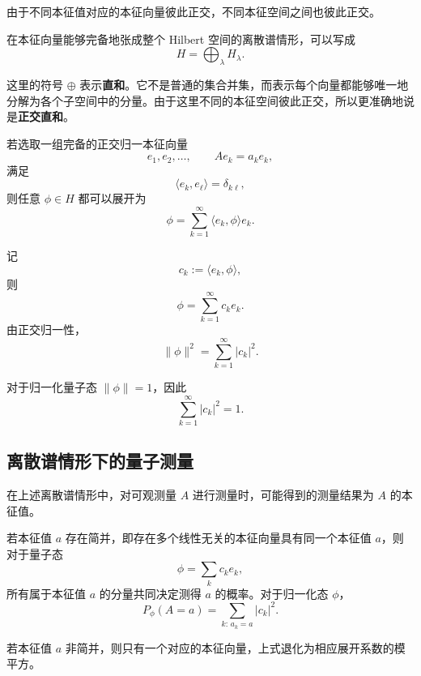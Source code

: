 \documentclass[UTF8,a4paper,11pt,openany]{ctexbook}
\begin{document}
由于不同本征值对应的本征向量彼此正交，不同本征空间之间也彼此正交。

在本征向量能够完备地张成整个 Hilbert 空间的离散谱情形，可以写成
\begin{equation}
    H
    =
    \bigoplus_{\lambda}H_\lambda.
\end{equation}

这里的符号 $\oplus$ 表示\textbf{直和}。它不是普通的集合并集，而表示每个向量都能够唯一地分解为各个子空间中的分量。由于这里不同的本征空间彼此正交，所以更准确地说是\textbf{正交直和}。

若选取一组完备的正交归一本征向量
\[
e_1,e_2,\ldots,
\qquad
Ae_k=a_ke_k,
\]
满足
\begin{equation}
    \langle e_k,e_\ell\rangle
    =
    \delta_{k\ell},
\end{equation}
则任意 $\phi\in H$ 都可以展开为
\begin{equation}
    \phi
    =
    \sum_{k=1}^{\infty}
    \langle e_k,\phi\rangle e_k.
\end{equation}

记
\[
c_k:=\langle e_k,\phi\rangle,
\]
则
\[
\phi
=
\sum_{k=1}^{\infty}c_ke_k.
\]
由正交归一性，
\begin{equation}
    \|\phi\|^2
    =
    \sum_{k=1}^{\infty}|c_k|^2.
\end{equation}

对于归一化量子态 $\|\phi\|=1$，因此
\begin{equation}
    \sum_{k=1}^{\infty}|c_k|^2=1.
\end{equation}

\subsection{离散谱情形下的量子测量}

\begin{definition}[量子力学公设三：测量]
在上述离散谱情形中，对可观测量 $A$ 进行测量时，可能得到的测量结果为 $A$ 的本征值。

若本征值 $a$ 存在简并，即存在多个线性无关的本征向量具有同一个本征值 $a$，则对于量子态
\[
\phi=\sum_k c_ke_k,
\]
所有属于本征值 $a$ 的分量共同决定测得 $a$ 的概率。对于归一化态 $\phi$，
\begin{equation}
    P_\phi(A=a)
    =
    \sum_{k:\,a_k=a}|c_k|^2.
\end{equation}

若本征值 $a$ 非简并，则只有一个对应的本征向量，上式退化为相应展开系数的模平方。
\end{definition}
\end{document}

